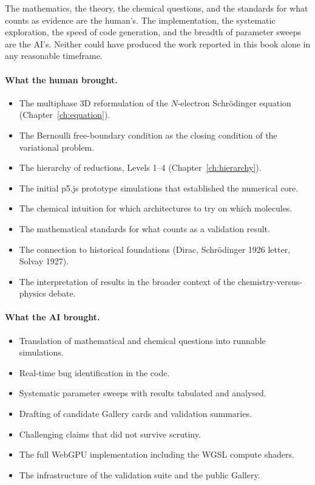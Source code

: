The mathematics, the theory, the chemical questions, and the standards for what counts as evidence are the human's. The implementation, the systematic exploration, the speed of code generation, and the breadth of parameter sweeps are the AI's. Neither could have produced the work reported in this book alone in any reasonable timeframe.

\paragraph{What the human brought.}
\begin{itemize}
\item The multiphase 3D reformulation of the $N$-electron Schr\"odinger equation (Chapter~\ref{ch:equation}).
\item The Bernoulli free-boundary condition as the closing condition of the variational problem.
\item The hierarchy of reductions, Levels 1--4 (Chapter~\ref{ch:hierarchy}).
\item The initial p5.js prototype simulations that established the numerical core.
\item The chemical intuition for which architectures to try on which molecules.
\item The mathematical standards for what counts as a validation result.
\item The connection to historical foundations (Dirac, Schr\"odinger 1926 letter, Solvay 1927).
\item The interpretation of results in the broader context of the chemistry-versus-physics debate.
\end{itemize}

\paragraph{What the AI brought.}
\begin{itemize}
\item Translation of mathematical and chemical questions into runnable simulations.
\item Real-time bug identification in the code.
\item Systematic parameter sweeps with results tabulated and analysed.
\item Drafting of candidate Gallery cards and validation summaries.
\item Challenging claims that did not survive scrutiny.
\item The full WebGPU implementation including the WGSL compute shaders.
\item The infrastructure of the validation suite and the public Gallery.
\end{itemize}

